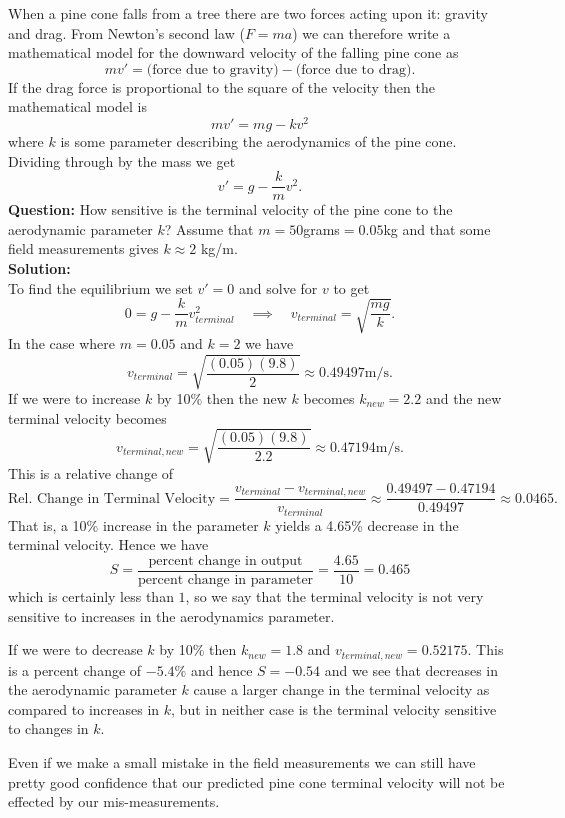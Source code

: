 \begin{example}
    When a pine cone falls from a tree there are two forces acting upon it: gravity and
    drag.  From Newton's second law ($F = ma$) we can therefore write a mathematical model
    for the downward velocity of the falling pine cone as
    \[ mv' = \text{(force due to gravity)} - \text{(force due to drag)}. \]
    If the drag force is proportional to the square of the velocity then the mathematical model is
    \[ mv' = mg - kv^2 \]
    where $k$ is some parameter describing the aerodynamics of the pine cone.  Dividing
    through by the mass we get
    \[ v' = g - \frac{k}{m} v^2. \]
    {\bf Question:} How sensitive is the terminal velocity of the pine cone to the
    aerodynamic parameter $k$?  Assume that $m = 50$grams$ = 0.05$kg and that some field
    measurements gives $k \approx 2$ kg/m.  \\
    {\bf Solution:} \\
    To find the equilibrium we set $v' = 0$ and solve for $v$ to get
    \[ 0 = g - \frac{k}{m} v_{terminal}^2 \quad \implies \quad v_{terminal} =
    \sqrt{\frac{mg}{k} }. \]
    In the case where $m = 0.05$ and $k=2$ we have 
    \[ v_{terminal} = \sqrt{\frac{(0.05)(9.8)}{2} } \approx 0.49497 \text{m/s}. \]
    If we were to increase $k$ by 10\% then the new $k$ becomes $k_{new} = 2.2$ and the
    new terminal velocity becomes 
    \[ v_{terminal,new} = \sqrt{\frac{(0.05)(9.8)}{2.2} } \approx 0.47194 \text{m/s}. \]
    This is a relative change of 
    \[ \text{Rel. Change in Terminal Velocity} = \frac{v_{terminal} -
    v_{terminal,new}}{v_{terminal}} \approx \frac{0.49497 - 0.47194}{0.49497} \approx
0.0465. \]
    That is, a 10\% increase in the parameter $k$ yields a 4.65\% decrease in the terminal
    velocity.  Hence we have 
    \[ S = \frac{ \text{percent change in output} }{ \text{percent change in parameter} }
    = \frac{4.65}{10} = 0.465\]
    which is certainly less than $1$, so we say that the terminal velocity is not very
    sensitive to increases in the aerodynamics parameter.

    If we were to decrease $k$ by 10\% then $k_{new} = 1.8$ and $v_{terminal,new} =
    0.52175$.  This is a percent change of $-5.4\%$ and hence $S = -0.54$ and we see that
    decreases in the aerodynamic parameter $k$ cause a larger change in the terminal
    velocity as compared to increases in $k$, but in neither case is the terminal velocity
    sensitive to changes in $k$.

    \vspace{0.1in} Even if we make a small mistake in the field measurements we can
    still have pretty good confidence that our predicted pine cone terminal velocity will
    not be effected by our mis-measurements.
\end{example}





